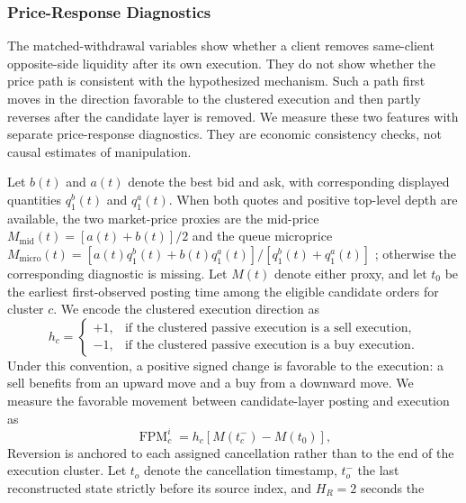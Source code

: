 \documentclass[11pt]{article}
\begin{document}
\subsubsection{Price-Response Diagnostics}
\label{subsec:price_response_diagnostics}

The matched-withdrawal variables show whether a client removes same-client opposite-side liquidity after its own
execution. They do not show whether the price path is consistent with the hypothesized mechanism. Such a path first moves
in the direction favorable to the clustered execution and then partly reverses after the candidate layer is removed. We
measure these two features with separate price-response diagnostics. They are economic consistency checks, not causal
estimates of manipulation.

Let $b(t)$ and $a(t)$ denote the best bid and ask, with corresponding displayed quantities $q^b_1(t)$ and $q^a_1(t)$. When
both quotes and positive top-level depth are available, the two market-price proxies are the mid-price
$M_{\mathrm{mid}}(t)=[a(t)+b(t)]/2$ and the queue microprice
$M_{\mathrm{micro}}(t)=[a(t)q^b_1(t)+b(t)q^a_1(t)]/[q^b_1(t)+q^a_1(t)]$
\cite{Stoikov02122018}; otherwise the corresponding diagnostic is missing. Let $M(t)$ denote either proxy, and let $t_0$
be the earliest first-observed posting time among the eligible candidate orders for cluster $c$. We encode the clustered
execution direction as
\begin{equation}
    h_c=
    \begin{cases}
        +1, & \text{if the clustered passive execution is a sell execution,}\\
        -1, & \text{if the clustered passive execution is a buy execution.}
    \end{cases}
    \label{eq:price_response_direction}
\end{equation}
Under this convention, a positive signed change is favorable to the execution: a sell benefits from an upward move and a
buy from a downward move. We measure the favorable movement between candidate-layer posting and execution as
\begin{equation}
    \operatorname{FPM}^{i}_{c}
    =
    h_c\left[M(t_c^{-})-M(t_0)\right],
    \label{eq:favorable_price_move}
\end{equation}
Reversion is anchored to each assigned cancellation rather than to the end of the execution cluster. Let $t_o$ denote the
cancellation timestamp, $t_o^{-}$ the last reconstructed state strictly before its source index, and $H_R=2$ seconds the
\end{document}
